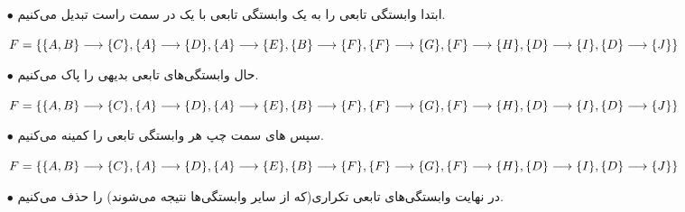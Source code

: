 \documentclass{article}
\begin{document}
\begin{itemize}
    \item [$\bullet$] ابتدا وابستگی تابعی را به یک وابستگی تابعی با یک  در سمت راست تبدیل می‌کنیم.

\begin{latin}
$
\\F=\\
\{\\
\{A, B\}\longrightarrow\{C\},\\
\{A\}\longrightarrow\{D\},\\
\{A\}\longrightarrow\{E\},\\
\{B\}\longrightarrow\{F\},\\
\{F\}\longrightarrow\{G\},\\
\{F\}\longrightarrow\{H\},\\
\{D\}\longrightarrow\{I\},\\
\{D\}\longrightarrow\{J\}\\
\}
$
\end{latin}
    \item [$\bullet$] حال وابستگی‌های تابعی بدیهی را پاک می‌کنیم.
\begin{latin}
$
\\F=\\
\{\\
\{A, B\}\longrightarrow\{C\},\\
\{A\}\longrightarrow\{D\},\\
\{A\}\longrightarrow\{E\},\\
\{B\}\longrightarrow\{F\},\\
\{F\}\longrightarrow\{G\},\\
\{F\}\longrightarrow\{H\},\\
\{D\}\longrightarrow\{I\},\\
\{D\}\longrightarrow\{J\}\\
\}
$
\end{latin}
    \item [$\bullet$] سپس های سمت چپ هر وابستگی تابعی را کمینه می‌کنیم.

\begin{latin}
$
\\F=\\
\{\\
\{A, B\}\longrightarrow\{C\},\\
\{A\}\longrightarrow\{D\},\\
\{A\}\longrightarrow\{E\},\\
\{B\}\longrightarrow\{F\},\\
\{F\}\longrightarrow\{G\},\\
\{F\}\longrightarrow\{H\},\\
\{D\}\longrightarrow\{I\},\\
\{D\}\longrightarrow\{J\}\\
\}
$
\end{latin}
    \item [$\bullet$] در نهایت وابستگی‌های تابعی تکراری(که از سایر وابستگی‌ها نتیجه می‌شوند) را حذف می‌کنیم.


\end{itemize}
\end{document}
